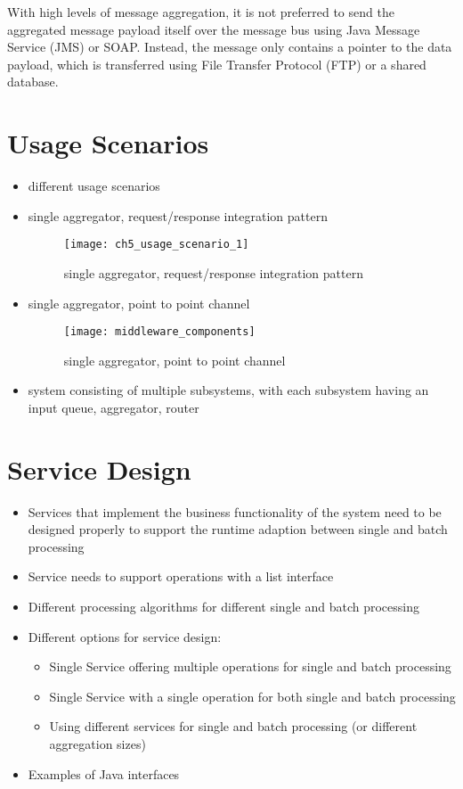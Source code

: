 With high levels of message aggregation, it is not preferred to send the aggregated message payload itself over the message bus using Java Message Service (JMS) or SOAP. Instead, the message only contains a pointer to the data payload, which is transferred using File Transfer Protocol (FTP) or a shared database.

\section{Usage Scenarios}

\begin{itemize}
	\item different usage scenarios
	\item single aggregator, request/response integration pattern
	\begin{figure*}[htpb]
		\centering
		\texttt{[image: ch5\_usage\_scenario\_1]}
		\caption{single aggregator, request/response integration pattern}
		\label{fig:ch4_usage_scenario_1}
	\end{figure*}
	\item single aggregator, point to point channel
	\begin{figure*}[htpb]
		\centering
		\texttt{[image: middleware\_components]}
		\caption{single aggregator, point to point channel}
		\label{fig:ch5_usage_scenario_2}
	\end{figure*}
	\item system consisting of multiple subsystems, with each subsystem having an input queue, aggregator, router
	
\end{itemize}	

\section{Service Design}
\label{sec:ch05_service_design}

\begin{itemize}
	\item Services that implement the business functionality of the system need to be designed properly to support the runtime adaption between single and batch processing
	\item Service needs to support operations with a list interface
	\item Different processing algorithms for different single and batch processing
	\item Different options for service design:
	\begin{itemize}
		\item Single Service offering multiple operations for single and batch processing
		\item Single Service with a single operation for both single and batch processing
		\item Using different services for single and batch processing (or different aggregation sizes)
	\end{itemize}
	\item Examples of Java interfaces
\end{itemize}

